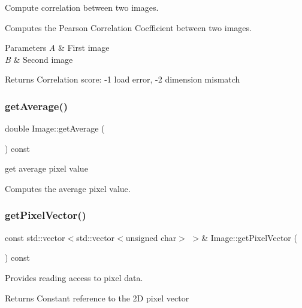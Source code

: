 Compute correlation between two images. 

Computes the Pearson Correlation Coefficient between two images.


\begin{DoxyParams}{Parameters}
{\em A} & First image \\
\hline
{\em B} & Second image \\
\hline
\end{DoxyParams}
\begin{DoxyReturn}{Returns}
Correlation score\+: -\/1 load error, -\/2 dimension mismatch 
\end{DoxyReturn}
\mbox{\label{classImage_a9e6bad7a8619c428cac2b7d079c827c6}} 
\subsubsection{\texorpdfstring{get\+Average()}{getAverage()}}
{\footnotesize\ttfamily double Image\+::get\+Average (\begin{DoxyParamCaption}{ }\end{DoxyParamCaption}) const}



get average pixel value 

Computes the average pixel value. \mbox{\label{classImage_af41db2b0ba6d691495d23dd5db62eab1}} 
\subsubsection{\texorpdfstring{get\+Pixel\+Vector()}{getPixelVector()}}
{\footnotesize\ttfamily const std\+::vector$<$std\+::vector$<$unsigned char$>$ $>$\& Image\+::get\+Pixel\+Vector (\begin{DoxyParamCaption}{ }\end{DoxyParamCaption}) const\hspace{0.3cm}{\ttfamily [inline]}}



Provides reading access to pixel data. 

\begin{DoxyReturn}{Returns}
Constant reference to the 2D pixel vector 
\end{DoxyReturn}
\mbox{\label{classImage_ad5557cdd4e3ff3da5fd01e35f965a006}} 
